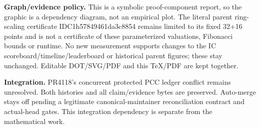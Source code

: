 \documentclass[10pt]{article}
\begin{document}
\textbf{Graph/evidence policy.} This is a symbolic proof-component report,
so the graphic is a dependency diagram, not an empirical plot. The literal
parent ring-scaling certificate IDC1h57849461da3c8854 remains limited to its
fixed 32+16 points and is not a certificate of these parameterized valuations,
Fibonacci bounds or runtime. No new measurement supports changes to the
IC scoreboard/timeline/leaderboard or historical parent figures; these stay
unchanged. Editable DOT/SVG/PDF and this TeX/PDF are kept together.

\textbf{Integration.} PR4118's concurrent protected PCC ledger conflict
remains unresolved. Both histories and all claim/evidence bytes are
preserved. Auto-merge stays off pending a legitimate canonical-maintainer
reconciliation contract and actual-head gates. This integration dependency
is separate from the mathematical work.
\end{document}
